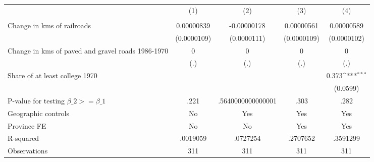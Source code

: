 {
\def\sym#1{\ifmmode^{#1}\else\(^{#1}\)\fi}
\begin{tabular}{l*{4}{c}}
\hline\hline
                &\multicolumn{1}{c}{(1)}&\multicolumn{1}{c}{(2)}&\multicolumn{1}{c}{(3)}&\multicolumn{1}{c}{(4)}\\
                &\multicolumn{1}{c}{}&\multicolumn{1}{c}{}&\multicolumn{1}{c}{}&\multicolumn{1}{c}{}\\
\hline
Change in kms of railroads&0.00000839         &-0.00000178         &0.00000561         &0.00000589         \\
                &(0.0000109)         &(0.0000111)         &(0.0000109)         &(0.0000102)         \\
[1em]
Change in kms of paved and gravel roads 1986-1970&        0         &        0         &        0         &        0         \\
                &      (.)         &      (.)         &      (.)         &      (.)         \\
[1em]
Share of at least college 1970&                  &                  &                  &    0.373\sym{***}\\
                &                  &                  &                  & (0.0599)         \\
\hline
P-value for testing $\beta\_{2} >= \beta\_{1}$&     .221         &.5640000000000001         &     .303         &     .282         \\
Geographic controls&       No         &      Yes         &      Yes         &      Yes         \\
Province FE     &       No         &       No         &      Yes         &      Yes         \\
R-squared       & .0019059         & .0727254         & .2707652         & .3591299         \\
Observations    &      311         &      311         &      311         &      311         \\
\hline\hline
\end{tabular}
}
